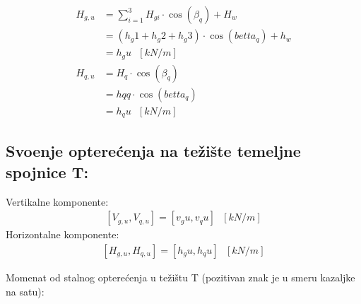 \documentclass[a4paper, 11pt]{article}
\begin{document}
\begin{align*}
H_{g,u} &= \sum_{i=1}^{3} H_{gi} \cdot \cos(\beta_{q}) + H_{w} \\
		&=  \left( h_g1 + h_g2 + h_g3 \right) \cdot \cos (betta_q) + h_w \\
		&= h_gu \text{ } [kN/m] \\
H_{q,u} &= H_{q} \cdot \cos (\beta_{q}) \\
		&= hqq \cdot \cos (betta_q) \\
		&= h_qu \text{ } [kN/m]
\end{align*}

\subsection*{Svo\dj enje optere\'cenja na te\v{z}i\v{s}te temeljne spojnice T:}
Vertikalne komponente:
\begin{align*}
\left[V_{g,u}, V_{q,u} \right] = \left[v_gu, v_qu \right] \text{ } [kN/m]
\end{align*}
Horizontalne komponente:
\begin{align*}
\left[ H_{g,u}, H_{q,u} \right] = \left[ h_gu, h_qu \right] \text{ } [kN/m]
\end{align*}

Momenat od stalnog optere\'cenja u te\v{z}i\v{s}tu T (pozitivan znak je u smeru kazaljke na satu):
\end{document}
